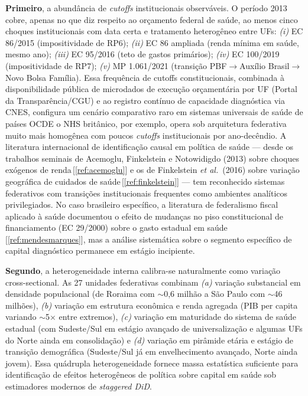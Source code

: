 \documentclass[12pt,a4paper,oneside]{article}
\begin{document}
\textbf{Primeiro}, a abundância de \textit{cutoffs} institucionais
observáveis. O período 2013 cobre, apenas no que
diz respeito ao orçamento federal de saúde, ao menos cinco choques
institucionais com data certa e tratamento heterogêneo entre UFs:
\textit{(i)} EC 86/2015 (impositividade de RP6); \textit{(ii)} EC
86 ampliada (renda mínima em saúde, mesmo ano); \textit{(iii)} EC
95/2016 (teto de gastos primários); \textit{(iv)} EC 100/2019
(impositividade de RP7); \textit{(v)} MP 1.061/2021 (transição
PBF$\to$Auxílio Brasil$\to$ Novo Bolsa Família). Essa frequência
de cutoffs constitucionais, combinada à disponibilidade pública
de microdados de execução orçamentária por UF (Portal da
Transparência/CGU) e ao registro contínuo de capacidade
diagnóstica via CNES, configura um cenário comparativo raro em
sistemas universais de saúde de países OCDE \textemdash{} o NHS
britânico, por exemplo, opera sob arquitetura federativa muito
mais homogênea com poucos \textit{cutoffs} institucionais por
ano-decêndio. A literatura internacional de identificação causal em
política de saúde — desde os trabalhos seminais de Acemoglu,
Finkelstein e Notowidigdo (2013) sobre choques exógenos de
renda\,[\ref{ref:acemoglu}] e os de Finkelstein \textit{et al.}\
(2016) sobre variação geográfica de cuidados de
saúde\,[\ref{ref:finkelstein}] — tem reconhecido sistemas
federativos com transições institucionais frequentes como
ambientes analíticos privilegiados. No caso brasileiro
específico, a literatura de federalismo fiscal aplicado à saúde
documentou o efeito de mudanças no piso constitucional de
financiamento (EC 29/2000) sobre o gasto estadual em
saúde\,[\ref{ref:mendesmarques}], mas a análise sistemática
sobre o segmento específico de capital diagnóstico permanece em
estágio incipiente.

\textbf{Segundo}, a heterogeneidade interna calibra-se naturalmente
como variação cross-sectional. As 27 unidades federativas
combinam \textit{(a)} variação substancial em densidade
populacional (de Roraima com $\sim$0,6 milhão a São Paulo com
$\sim$46 milhões), \textit{(b)} variação em estrutura
econômica e renda agregada (PIB per capita variando $\sim$5$\times$
entre extremos), \textit{(c)} variação em maturidade do sistema
de saúde estadual (com Sudeste/Sul em estágio avançado de
universalização e algumas UFs do Norte ainda em consolidação) e
\textit{(d)} variação em pirâmide etária e estágio de transição
demográfica (Sudeste/Sul já em envelhecimento avançado, Norte
ainda jovem). Essa quádrupla heterogeneidade fornece massa
estatística suficiente para identificação de efeitos
heterogêneos de política sobre capital em saúde sob estimadores
modernos de \textit{staggered DiD}.
\end{document}
